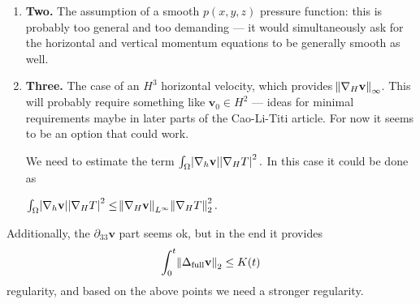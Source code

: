 \documentclass[11pt]{article}
\begin{document}
\begin{enumerate}
\begin{itemize}
$\nabla_H T_1$ could be estimated with $\nabla_H \partial_z \eta,$ but we don't have a full Laplacian estimate, or a vertical partial derivative estimate for $\eta.$ Creating one would bring in the part-task of estimating the $\Phi$ part of $\eta,$ which leaves us with needing to create a bound of $\epsilon^2 \Delta u_3.$

\item As pointed out before, $\textcolor{ao}{T_1}$ would need to have the $\norm{T_2}_\infty \leq \norm{({T_2})_0}_\infty$ property of $\textcolor{cadmiumorange}{T_2}.$

\end{itemize}

This approach would lead to need to have an $H^3$ regularity of $\epsilon u^\epsilon_3.$

\item \textbf{Two.} The assumption of a smooth $p(x,y,z)$ pressure function: this is probably too general and too demanding --- it would simultaneously ask for the horizontal and vertical momentum equations to be generally smooth as well. 

\item \textbf{Three.} The case of an $H^3$ horizontal velocity, which provides $\norm{\nabla_H \mathbf{v}}_\infty$. This will probably require something like $\mathbf{v}_0 \in H^2$ --- ideas for minimal requirements maybe in later parts of the Cao-Li-Titi article. For now it seems to be an option that could work.

We need to estimate the term $\int_\Omega \abs{\nabla_h \mathbf{v}} \abs{\nabla_H T}^2.$ In this case it could be done as

$\int_\Omega \abs{\nabla_h \mathbf{v}} \abs{\nabla_H T}^2 \leq \norm{\nabla_H \mathbf{v}}_{L^\infty} \norm{\nabla_H T}_2^2.$

\end{enumerate}

Additionally, the $\partial_{33} \mathbf{v}$ part seems ok, but in the end it provides $$\int_0^t \norm{\Delta_{\text{full}} \mathbf{v}}_2 \leq K(t)$$ regularity, and based on the above points we need a stronger regularity.
\end{document}
